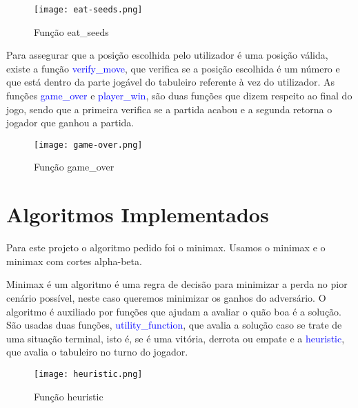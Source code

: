 \documentclass[conference]{IEEEtran}
\begin{document}
\begin{figure}[htbp]
    \centerline{\texttt{[image: eat-seeds.png]}}
    \caption{Fun\c c\~ao eat\_seeds}
    \label{img8}
\end{figure}

Para assegurar que a posi\c c\~ao escolhida pelo utilizador \'e uma posi\c c\~ao v\'alida, existe a fun\c c\~ao \textcolor{blue}{verify\_move}, que verifica se a posi\c c\~ao escolhida \'e um n\'umero e que est\'a dentro da parte jog\'avel do tabuleiro referente \`a vez do utilizador.
As fun\c c\~oes \textcolor{blue}{game\_over} e \textcolor{blue}{player\_win}, s\~ao duas fun\c c\~oes que dizem respeito ao final do jogo, sendo que a primeira verifica se a partida acabou e a segunda retorna o jogador que ganhou a partida.

\begin{figure}[htbp]
    \centerline{\texttt{[image: game-over.png]}}
    \caption{Fun\c c\~ao game\_over}
    \label{img9}
\end{figure}

\section{Algoritmos Implementados}


Para este projeto o algoritmo pedido foi o minimax. Usamos o minimax e o minimax com cortes alpha-beta\cite{b5}\cite{b6}.


Minimax \'e um algoritmo \'e uma regra de decis\~ao para minimizar a perda no pior cen\'ario poss\'ivel, neste caso queremos minimizar os ganhos do advers\'ario.
O algoritmo \'e auxiliado por fun\c c\~oes que ajudam a avaliar o qu\~ao boa \'e a solu\c c\~ao. S\~ao usadas duas fun\c c\~oes, \textcolor{blue}{utility\_function}, que avalia a solu\c c\~ao caso se trate de uma situa\c c\~ao terminal, isto \'e, se \'e uma vit\'oria, derrota ou empate e a \textcolor{blue}{heuristic}, que avalia o tabuleiro no turno do jogador.

\begin{figure}[htbp]
    \centerline{\texttt{[image: heuristic.png]}}
    \caption{Fun\c c\~ao heuristic}
    \label{img11}
\end{figure}
\end{document}
